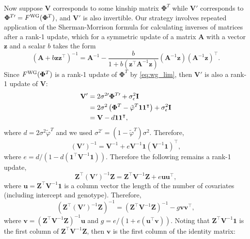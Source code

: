 \documentclass[11pt]{article}
\newcommand{\kinMat}[1][T]{%
  \ensuremath{%
    \mathbf{\Phi}^{#1}
  }%
  \xspace%
}%
\newcommand{\kinMatPrime}{%
  \ensuremath{%
    \mathbf{\Phi}^{T\prime}
  }%
  \xspace%
}%
\begin{document}
\begin{appendices}
  Now suppose $\mathbf{V}$ corresponds to some kinship matrix \kinMat while $\mathbf{V}'$ corresponds to $\kinMatPrime = F^\text{WG}(\kinMat)$, and $\mathbf{V}'$ is also invertible.
  Our strategy involves repeated application of the Sherman-Morrison formula for calculating inverses of matrices after a rank-1 update, which for a symmetric update of a matrix $\mathbf{A}$ with a vector $\mathbf{z}$ and a scalar $b$ takes the form \citep{sherman_adjustment_1950}
  $$
  \left( \mathbf{A} + b \mathbf{z}\mathbf{z}^\intercal \right)^{-1}
  =
  \mathbf{A}^{-1} - \frac{
    b
  }{
    1 + b \left( \mathbf{z}^\intercal \mathbf{A}^{-1} \mathbf{z} \right)
  }
  \left( \mathbf{A}^{-1} \mathbf{z} \right) \left( \mathbf{A}^{-1} \mathbf{z} \right)^\intercal
  .
  $$
  Since $F^\text{WG}(\kinMat)$ is a rank-1 update of \kinMat by \cref{eq:wg_lim}, then $\mathbf{V}'$ is also a rank-1 update of $\mathbf{V}$:
  \begin{align*}
    \mathbf{V}'
    &=
      2 \sigma^{2\prime} \kinMatPrime + \sigma^2_\epsilon \mathbf{I}
      \\
    &=
      2 \sigma^2 \left( \kinMat - \tilde{\varphi}^T \mathbf{1}\mathbf{1}^\intercal \right)
      + \sigma^2_\epsilon \mathbf{I}
      \\
    &=
    \mathbf{V} - d \mathbf{1}\mathbf{1}^\intercal
    ,
  \end{align*}
  where $d = 2 \sigma^2 \tilde{\varphi}^T$ and we used $\sigma^{2\prime} = \left( 1 - \tilde{\varphi}^T \right) \sigma^2$.
  Therefore,
  $$
  \left( \mathbf{V}' \right)^{-1}
  =
  \mathbf{V}^{-1} + e \mathbf{V}^{-1} \mathbf{1} \left( \mathbf{V}^{-1} \mathbf{1} \right)^\intercal
  ,
  $$
  where $e = d / \left( 1 - d \left( \mathbf{1}^\intercal \mathbf{V}^{-1} \mathbf{1} \right) \right)$.
  Therefore the following remains a rank-1 update,
  $$
  \mathbf{Z}^\intercal \left( \mathbf{V}' \right)^{-1} \mathbf{Z}
  =
  \mathbf{Z}^\intercal \mathbf{V}^{-1} \mathbf{Z} + e \mathbf{u} \mathbf{u}^\intercal
  ,
  $$
  where $\mathbf{u} = \mathbf{Z}^\intercal \mathbf{V}^{-1} \mathbf{1}$ is a column vector the length of the number of covariates (including intercept and genotype).
  Therefore, 
  $$
  \left( \mathbf{Z}^\intercal \left( \mathbf{V}' \right)^{-1} \mathbf{Z} \right)^{-1}
  =
  \left( \mathbf{Z}^\intercal \mathbf{V}^{-1} \mathbf{Z} \right)^{-1}
  - g \mathbf{v} \mathbf{v}^\intercal
  ,
  $$
  where $\mathbf{v} = \left( \mathbf{Z}^\intercal \mathbf{V}^{-1} \mathbf{Z} \right)^{-1} \mathbf{u}$
  and $g = e/(1 + e (\mathbf{u}^\intercal \mathbf{v}))$.
  Noting that $\mathbf{Z}^\intercal \mathbf{V}^{-1} \mathbf{1}$ is the first column of $\mathbf{Z}^\intercal \mathbf{V}^{-1} \mathbf{Z}$, then $\mathbf{v}$ is the first column of the identity matrix:

\end{appendices}
\end{document}
